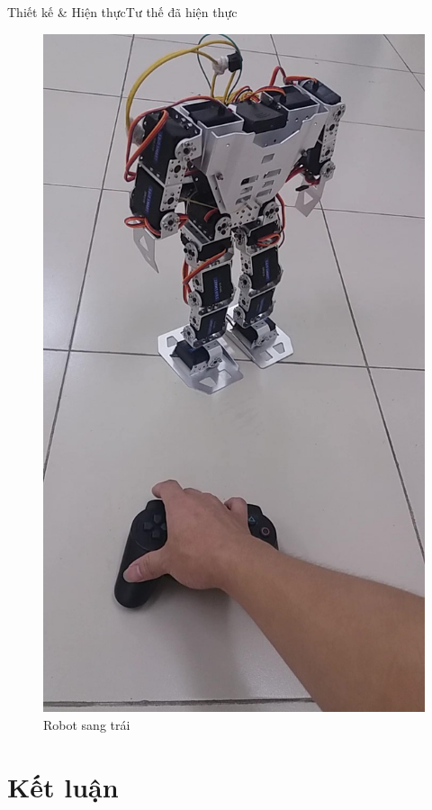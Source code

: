 \documentclass[compress, blue, 13pt,hyperref={pdfpagemode=FullScreen}]{beamer}
\begin{document}
\begin{frame}{Thiết kế \& Hiện thực}{Tư thế đã hiện thực}
\begin{multicols}{2}
\begin{figure}[hbtp]
\includegraphics[scale=0.1]{images/Results/RotateLeft2.jpg}
\caption{Robot sang trái}
\end{figure}

\end{multicols}
\end{frame}
\section{Kết luận}
\end{document}
